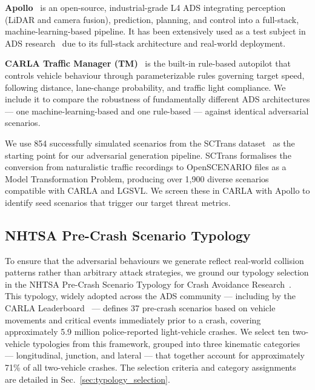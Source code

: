 \textbf{Apollo}~\cite{noauthor_apollo_nodate} is an open-source, industrial-grade L4 ADS integrating perception (LiDAR and camera fusion), prediction, planning, and control into a full-stack, machine-learning-based pipeline. It has been extensively used as a test subject in ADS research~\cite{dai_sctrans_2024, kim_drivefuzz_2022, yan_-demand_2025} due to its full-stack architecture and real-world deployment.

\textbf{CARLA Traffic Manager (TM)}~\cite{dosovitskiy_carla_2017} is the built-in rule-based autopilot that controls vehicle behaviour through parameterizable rules governing target speed, following distance, lane-change probability, and traffic light compliance. We include it to compare the robustness of fundamentally different ADS architectures --- one machine-learning-based and one rule-based --- against identical adversarial scenarios.

We use 854 successfully simulated scenarios from the SCTrans dataset~\cite{dai_sctrans_2024} as the starting point for our adversarial generation pipeline. SCTrans formalises the conversion from naturalistic traffic recordings to OpenSCENARIO files as a Model Transformation Problem, producing over 1,900 diverse scenarios compatible with CARLA and LGSVL. We screen these in CARLA with Apollo to identify seed scenarios that trigger our target threat metrics.

\subsection{NHTSA Pre-Crash Scenario Typology}\label{sec:NHTSA}

To ensure that the adversarial behaviours we generate reflect real-world collision patterns rather than arbitrary attack strategies, we ground our typology selection in the NHTSA Pre-Crash Scenario Typology for Crash Avoidance Research~\cite{noauthor_pre-crash_nodate}. This typology, widely adopted across the ADS community --- including by the CARLA Leaderboard~\cite{noauthor_carla_nodate} --- defines 37 pre-crash scenarios based on vehicle movements and critical events immediately prior to a crash, covering approximately 5.9 million police-reported light-vehicle crashes. We select ten two-vehicle typologies from this framework, grouped into three kinematic categories --- longitudinal, junction, and lateral --- that together account for approximately 71\% of all two-vehicle crashes. The selection criteria and category assignments are detailed in Sec.~\ref{sec:typology_selection}.

